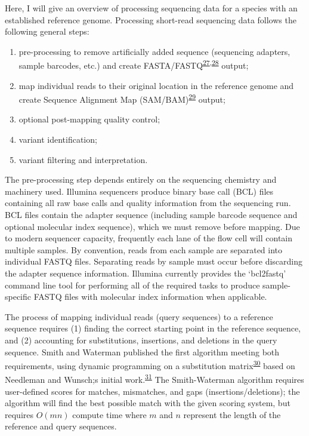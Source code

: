 \documentclass[11pt,letterpaper,oneside]{book}
\begin{document}
Here, I will give an overview of processing sequencing data for a species with an established reference genome.
Processing short-read sequencing data follows the following general steps:

\begin{enumerate}
\def\labelenumi{\arabic{enumi}.}
\item
  pre-processing to remove artificially added sequence (sequencing adapters, sample barcodes, etc.) and create FASTA/FASTQ\textsuperscript{\protect\hyperlink{ref-pearson:1988aa}{27},\protect\hyperlink{ref-cock:2010aa}{28}} output;
\item
  map individual reads to their original location in the reference genome and create Sequence Alignment Map (SAM/BAM)\textsuperscript{\protect\hyperlink{ref-li:2009aa}{29}} output;
\item
  optional post-mapping quality control;
\item
  variant identification;
\item
  variant filtering and interpretation.
\end{enumerate}

The pre-processing step depends entirely on the sequencing chemistry and machinery used.
Illumina sequencers produce binary base call (BCL) files containing all raw base calls and quality information from the sequencing run.
BCL files contain the adapter sequence (including sample barcode sequence and optional molecular index sequence), which we must remove before mapping.
Due to modern sequencer capacity, frequently each lane of the flow cell will contain multiple samples.
By convention, reads from each sample are separated into individual FASTQ files.
Separating reads by sample must occur before discarding the adapter sequence information.
Illumina currently provides the `bcl2fastq' command line tool for performing all of the required tasks to produce sample-specific FASTQ files with molecular index information when applicable.

The process of mapping individual reads (query sequences) to a reference sequence requires (1) finding the correct starting point in the reference sequence, and (2) accounting for substitutions, insertions, and deletions in the query sequence.
Smith and Waterman published the first algorithm meeting both requirements, using dynamic programming on a substitution matrix\textsuperscript{\protect\hyperlink{ref-smith:1981aa}{30}} based on Needleman and Wunsch;s initial work.\textsuperscript{\protect\hyperlink{ref-needleman:1970aa}{31}}
The Smith-Waterman algorithm requires user-defined scores for matches, mismatches, and gaps (insertions/deletions); the algorithm will find the best possible match with the given scoring system, but requires \(O(mn)\) compute time where \(m\) and \(n\) represent the length of the reference and query sequences.
\end{document}
